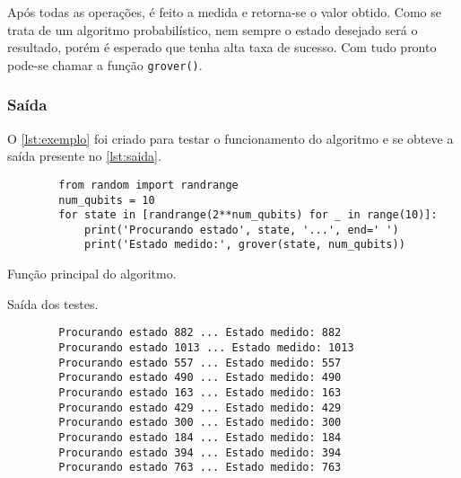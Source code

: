 Após todas as operações, é feito a medida e retorna-se o valor obtido.
Como se trata de um algoritmo probabilístico, nem sempre o estado desejado será o resultado, porém é esperado que tenha alta taxa de sucesso.
Com tudo pronto pode-se chamar a função \texttt{grover()}.

\subsubsection{Saída}\label{subsubsec:saida}

O \autoref{lst:exemplo} foi criado para testar o funcionamento do algoritmo e se obteve a saída presente no \autoref{lst:saida}.

\begin{listing}[!htb]
    \begin{verbatim}
        from random import randrange
        num_qubits = 10
        for state in [randrange(2**num_qubits) for _ in range(10)]:
            print('Procurando estado', state, '...', end=' ')
            print('Estado medido:', grover(state, num_qubits))
    \end{verbatim}
    \caption{Função principal do algoritmo.}
    \label{lst:exemplo}
\end{listing}


\begin{listing}[!htb]
    \caption{Saída dos testes.}
    \label{lst:saida}
    \begin{verbatim}
        Procurando estado 882 ... Estado medido: 882
        Procurando estado 1013 ... Estado medido: 1013
        Procurando estado 557 ... Estado medido: 557
        Procurando estado 490 ... Estado medido: 490
        Procurando estado 163 ... Estado medido: 163
        Procurando estado 429 ... Estado medido: 429
        Procurando estado 300 ... Estado medido: 300
        Procurando estado 184 ... Estado medido: 184
        Procurando estado 394 ... Estado medido: 394
        Procurando estado 763 ... Estado medido: 763
    \end{verbatim}
\end{listing}
